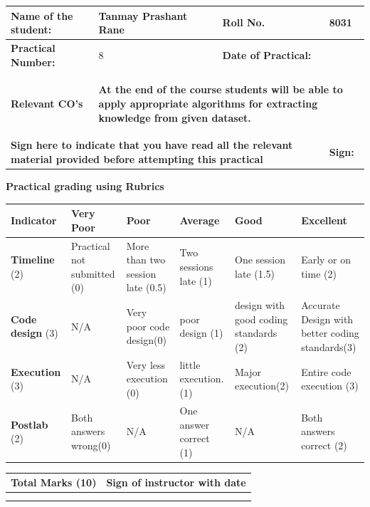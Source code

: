 \documentclass[11pt,article]{memoir}
\begin{document}
\sloppy
\fancypage{\doublebox}{}
\begin{flushleft}


    \begin{tabular}{ | p{4cm} | p{5cm} | p{3.5cm} | p{2cm} |}
    \hline

    \textbf{Name of the student:}& Tanmay Prashant Rane &\textbf{Roll No.} & 8031 \\ \hline
    \textbf{Practical Number:}& 8 & \textbf{Date of Practical:} & \\ \hline
	\textbf{Relevant CO's} & \multicolumn{3}{|p{10.5cm}|}{\begin{flushleft}
	\textbf{At the end of the course students will be able to apply appropriate algorithms for extracting knowledge from given dataset.}
	\end{flushleft}}\\
    \hline
    \multicolumn{3}{|p{12.5cm}|}{\textbf{Sign here to indicate that you have read all the relevant material provided before attempting this practical}}& \textbf{Sign:}\\ \hline
    \end{tabular}
    \vspace{1cm}
        \textbf{Practical grading using Rubrics}
           \begin{tabular}{|p{2cm}|p{2cm}|p{2cm}|p{2cm}|p{2cm}|p{2cm}|}
           \hline \textbf{Indicator} & \textbf{Very Poor} & \textbf{Poor} & \textbf{Average} & \textbf{Good} & \textbf{Excellent} \\ 
           \hline \textbf{Timeline} (2) & Practical not submitted (0) & More than two session late (0.5) & Two sessions late (1) & One session late (1.5) & Early or on time (2) \\ 
           \hline \textbf{Code design} (3) & N/A & Very poor code design(0) & poor design (1) & design with good coding standards (2) & Accurate Design with better coding standards(3) \\ 
           \hline \textbf{Execution} (3) & N/A & Very less execution (0)
            & little execution.(1) & Major execution(2)
            & Entire code execution (3) \\ 
           \hline \textbf{Postlab} (2) & Both answers wrong(0) & N/A& One answer correct (1) & N/A & Both answers correct (2) \\ 
           \hline 
           \end{tabular}
        \vspace{-8cm}
        \begin{table}[h!]
        \centering
        \begin{tabular}{|c|c|}
                \hline \textbf{Total Marks (10)} & \textbf{Sign of instructor with date} \\ 
                \hline  &  \\ & \\
                \hline 
                \end{tabular} 
        \end{table}
        

\end{flushleft}
\end{document}
